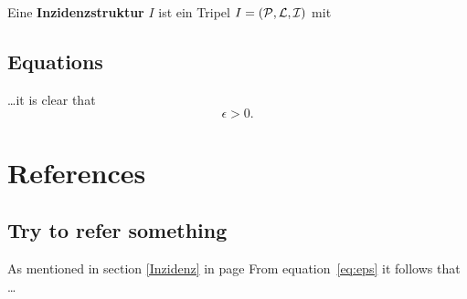 \documentclass[8pt,oneside, german ,a4paper, fleqn, titlepage]{report}
\begin{document}
  
Eine {\bf Inzidenzstruktur} $I$ ist ein Tripel $I=({\cal{P,L,I}})$ mit  
\label{Inzidenz}

\subsection{Equations}
\ldots it is clear that
\begin{equation}
\epsilon > 0.
\label{eq:eps}
\end{equation}

\section{References}
\subsection{Try to refer something}
As mentioned in section \ref{Inzidenz} in page \pageref{Inzidenz} \textellipsis  \newline
From equation~\ref{eq:eps} it follows that \ldots







  
	
\end{document}
